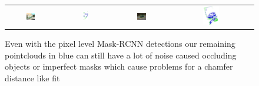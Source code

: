 \begin{figure}
    \centering
    \begin{tabular}{c c c c}

         \includegraphics[width=0.2\textwidth]{figures/method/ambiguous/ex3/rgb.png}
        &\includegraphics[width=0.1\textwidth]{figures/method/ambiguous/ex3/pcd.png} &
         \includegraphics[width=0.2\textwidth]{figures/method/ambiguous/ex5/rgb.png}
        &\includegraphics[width=0.2\textwidth]{figures/method/ambiguous/ex5/pcd.png}
        
    \end{tabular}
    
    \caption{Even with the pixel level Mask-RCNN detections our remaining pointclouds in blue can still have a lot of noise caused occluding objects or imperfect masks which cause problems for a chamfer distance like fit}
    \label{fig:dataset_example}
    
\end{figure}